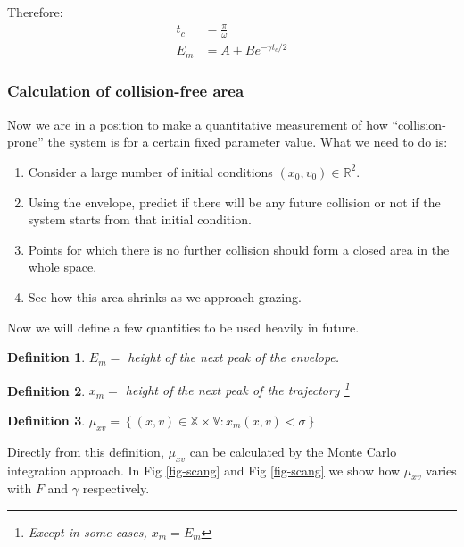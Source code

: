 \documentclass[oneside]{book}
\renewcommand{\(}{\begin{columns}}
\renewcommand{\)}{\end{columns}}
\newcommand{\<}[1]{\begin{column}{#1}}
\renewcommand{\>}{\end{column}}
\newtheorem{definition}{Definition}[section]
\begin{document}
Therefore:
\begin{align}
t_c&=\frac{\pi}{\omega}\\
E_m&=A+Be^{-\gamma t_c/2}
\end{align}



\subsubsection{Calculation of collision-free area}
Now we are in a position to make a quantitative measurement of how 
``collision-prone'' the system is for a certain fixed parameter value.  What 
we need to do is:

\begin{enumerate}
\item Consider a large number of initial conditions $(x_0,v_0)\in \mathbb{R}^2$.  
\item Using the envelope, predict if there will be 
any future collision or not if the system starts from that initial condition.  
\item Points for which there is no further collision should form a closed area 
in the whole space.  
\item See how this area shrinks as we approach grazing.  
\end{enumerate}

Now we will define a few quantities to be used heavily in future.  

\begin{definition}
$E_m= $ height of the next peak of the envelope.  
\end{definition}

\begin{definition}
$x_m= $ height of the next peak of the trajectory  \footnote{Except in 
some cases, $x_m=E_m$}
\end{definition}

\begin{definition}
\label{def-mu}
$\mu_{xv}=\left\{(x,v)\in\mathbb{X\times V}:x_m(x,v)<\sigma\right\}$
\end{definition}

Directly from this definition, $\mu_{xv}$ can be calculated by the Monte Carlo 
integration approach.  In Fig \ref{fig-scang} and Fig \ref{fig-scang} we 
show how $\mu_{xv}$ varies with $F$ and $\gamma$ respectively.  
\end{document}
